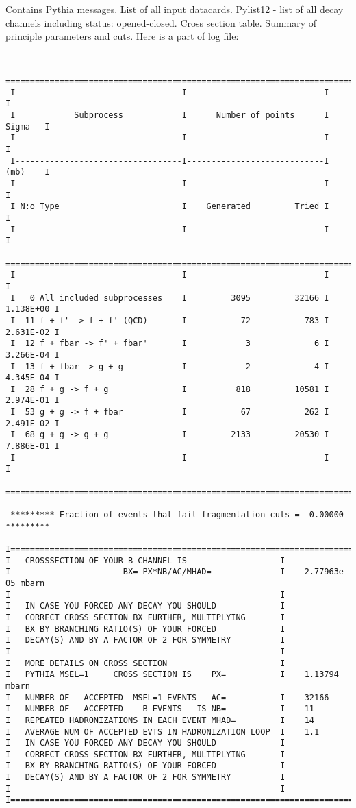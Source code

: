 Contains Pythia messages. List of all input datacards.
Pylist12 - list of all decay channels including status: opened-closed.
Cross section table. Summary of principle parameters and cuts.
Here is a part of log file:
\begin{verbatim}

 ==============================================================================
 I                                  I                            I            I
 I            Subprocess            I      Number of points      I    Sigma   I
 I                                  I                            I            I
 I----------------------------------I----------------------------I    (mb)    I
 I                                  I                            I            I
 I N:o Type                         I    Generated         Tried I            I
 I                                  I                            I            I
 ==============================================================================
 I                                  I                            I            I
 I   0 All included subprocesses    I         3095         32166 I  1.138E+00 I
 I  11 f + f' -> f + f' (QCD)       I           72           783 I  2.631E-02 I
 I  12 f + fbar -> f' + fbar'       I            3             6 I  3.266E-04 I
 I  13 f + fbar -> g + g            I            2             4 I  4.345E-04 I
 I  28 f + g -> f + g               I          818         10581 I  2.974E-01 I
 I  53 g + g -> f + fbar            I           67           262 I  2.491E-02 I
 I  68 g + g -> g + g               I         2133         20530 I  7.886E-01 I
 I                                  I                            I            I
 ==============================================================================

 ********* Fraction of events that fail fragmentation cuts =  0.00000 *********

I=====================================================================================
I   CROSSSECTION OF YOUR B-CHANNEL IS                   I
I                       BX= PX*NB/AC/MHAD=              I    2.77963e-05 mbarn
I                                                       I
I   IN CASE YOU FORCED ANY DECAY YOU SHOULD             I
I   CORRECT CROSS SECTION BX FURTHER, MULTIPLYING       I
I   BX BY BRANCHING RATIO(S) OF YOUR FORCED             I
I   DECAY(S) AND BY A FACTOR OF 2 FOR SYMMETRY          I
I                                                       I
I   MORE DETAILS ON CROSS SECTION                       I
I   PYTHIA MSEL=1     CROSS SECTION IS    PX=           I    1.13794 mbarn
I   NUMBER OF   ACCEPTED  MSEL=1 EVENTS   AC=           I    32166
I   NUMBER OF   ACCEPTED    B-EVENTS   IS NB=           I    11
I   REPEATED HADRONIZATIONS IN EACH EVENT MHAD=         I    14
I   AVERAGE NUM OF ACCEPTED EVTS IN HADRONIZATION LOOP  I    1.1
I   IN CASE YOU FORCED ANY DECAY YOU SHOULD             I
I   CORRECT CROSS SECTION BX FURTHER, MULTIPLYING       I
I   BX BY BRANCHING RATIO(S) OF YOUR FORCED             I
I   DECAY(S) AND BY A FACTOR OF 2 FOR SYMMETRY          I
I                                                       I
I=====================================================================================


\end{verbatim}
